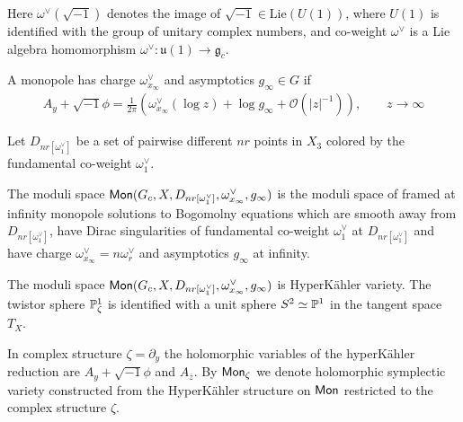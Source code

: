 \documentclass[12pt,psamsfonts,reqno]{amsart}
\begin{document}
Here $\omega^{\vee}(\sqrt{-1})$ denotes the image of $\sqrt{-1} \in \mathrm{Lie}(U(1))$,
where $U(1)$ is identified with the group of unitary complex numbers,
and co-weight $\omega^{\vee}$ is a Lie algebra homomorphism $\omega^{\vee}: \mathfrak{u}(1) \to \mathfrak{g}_{c}$.

\begin{definition}
A  monopole
has charge $\omega^{\vee}_{x_\infty}$ and asymptotics $g_{\infty} \in G$ if 
\begin{equation}
  \begin{aligned}
   A_y  +  \sqrt{-1} \phi = \frac{1}{2\pi} \left( \omega^{\vee}_{x_{\infty}}( \log z)  + \log g_{\infty} + \mathcal{O}(|z|^{-1})  \right), \qquad z \to \infty
  \end{aligned}
\end{equation}
\end{definition}

Let $D_{nr[\omega_1^{\vee}]}$ be a set of pairwise different $nr$ points in $X_3$ 
colored by the fundamental co-weight $\omega^{\vee}_{1}$. 


\begin{definition}
The moduli space $\mathsf{Mon}(G_{c}, X, D_{nr[\omega_1^{\vee}]}, \omega_{x_\infty}^{\vee},  g_{\infty})$ is the moduli space of 
framed at infinity monopole solutions to Bogomolny equations which are smooth away from $D_{nr[\omega_1^{\vee}]}$, 
have Dirac singularities of fundamental co-weight $\omega_1^{\vee}$  at $D_{nr[\omega_1^{\vee}]}$
and have charge $\omega_{x_\infty}^{\vee} = n\omega_{r}^{\vee}$ and asymptotics $g_\infty$ at infinity. 
\end{definition}



\begin{proposition}
  The moduli space $\mathsf{Mon}(G_{c}, X, D_{nr[\omega_1^{\vee}]}, \omega_{x_\infty}^{\vee},  g_{\infty})$ is HyperK\"ahler variety.
  The twistor sphere $\mathbb P^1_{\zeta}$ is identified with a unit sphere $S^2 \simeq \mathbb P^1$ in the tangent space $T_{X}$.
\end{proposition}

\begin{definition}
 In complex structure $\zeta = \partial_{y}$ the holomorphic variables of the hyperK\"ahler reduction
  are $A_y + \sqrt{-1} \phi$ and $A_{\bar z}$. By $\mathsf{Mon}_{\zeta}$
  we denote holomorphic symplectic variety constructed from the HyperK\"ahler structure on $\mathsf{Mon}$ restricted
  to the complex structure $\zeta$.  
\end{definition}
\end{document}
